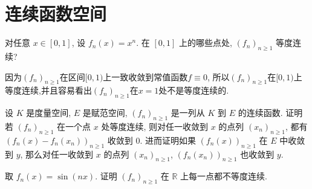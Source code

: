 \chapter{连续函数空间}
\thispagestyle{empty}



\begin{exercise}
    对任意 $x\in [0,1]$, 设 $f_n(x)=x^n$. 在 $[0,1]$ 上的哪些点处, $(f_n)_{n\geq 1}$ 等度连续?
\end{exercise}

\begin{solution}
    因为$(f_n)_{n\geq 1}$在区间$[0,1)$上一致收敛到常值函数$f\equiv0$,
    所以$(f_n)_{n\geq 1}$在$[0,1)$上等度连续,并且容易看出$(f_n)_{n\geq 1}$在$x=1$处不是等度连续的.
\end{solution}



\begin{exercise}
    设 $K$ 是度量空间, $E$ 是赋范空间, $\left(f_{n}\right)_{n\geq 1}$ 是一列从 $K$ 到 $E$ 的连续函数. 
    证明若 $(f_{n})_{n\geq 1}$ 在一个点 $x$ 处等度连续, 则对任一收敛到 $x$ 
    的点列 $(x_{n})_{n\geq 1}$, 都有 $(f_{n}(x)-f_{n}(x_n))_{n\geq 1}$ 收敛到 $0$. 
    进而证明如果 $(f_{n}(x))_{n\geq 1}$ 在 $E$ 中收敛到 $y$, 
    那么对任一收敛到 $x$ 的点列 $(x_{n})_{n\geq 1}$, $(f_{n}(x_{n}))_{n\geq 1}$ 也收敛到 $y$.

    取 $f_{n}(x)=\sin(nx)$. 证明 $(f_{n})_{n\geq 1}$ 在 $\mathbb{R}$ 上每一点都不等度连续.
\end{exercise}

